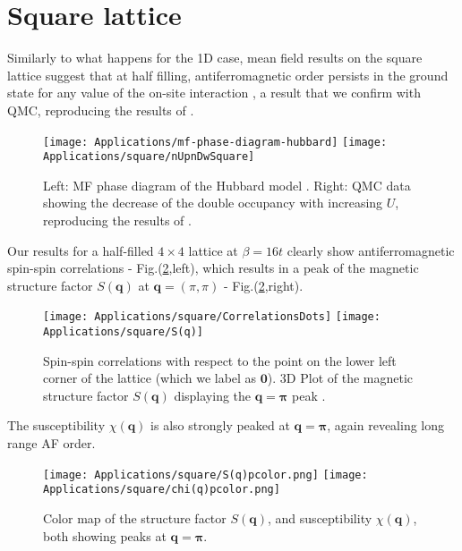 \section{Square lattice}
\label{sec:square}

Similarly to what happens for the \acs{1D} case, mean field results on the square lattice suggest that at half filling, antiferromagnetic order persists in the ground state for any value of the on-site interaction \cite{claveau_mean-field_2014, gouveia_magnetic_2015}, a result that we confirm with \acs{QMC}, reproducing the results of \cite{white_numerical_1989, hirsch_two-dimensional_1985}.

\begin{figure}[H]
\label{fig:mfHubbardPhaseDiagram}
\hspace{-0.18cm}
\texttt{[image: Applications/mf-phase-diagram-hubbard]}
\texttt{[image: Applications/square/nUpnDwSquare]}
\caption[Mean field phase diagram of the Hubbard model. \ac{QMC} data showing the decrease of the double occupancy with increasing $U$.]{Left: MF phase diagram of the Hubbard model \cite{gouveia_magnetic_2015}.
Right: \ac{QMC} data showing the decrease of the double occupancy with increasing $U$, reproducing the results of \cite{white_numerical_1989}.}
\end{figure}
Our results for a half-filled $4 \times 4$ lattice at $\beta = 16 t$ clearly show antiferromagnetic spin-spin correlations - Fig.(\ref{fig:corrSq},left), which results in a peak of the magnetic structure factor $S (\bm q)$ at $\bm q = (\pi, \pi)$ - Fig.(\ref{fig:corrSq},right).
\begin{figure}[H]
\hspace{-0.3cm}
\texttt{[image: Applications/square/CorrelationsDots]}
\hspace{0.4cm}
\texttt{[image: Applications/square/S(q)]}
\caption[Spin-spin correlations on the square lattice.
Magnetic structure factors showing a peak at $\bm q = \bm \pi$.]{Spin-spin correlations with respect to the point on the lower left corner of the lattice (which we label as $\bm 0$).
3D Plot of the magnetic structure factor $S ( \bm q)$ displaying the $\bm q = \bm \pi$ peak \label{fig:corrSq}.}
\end{figure}
The susceptibility $\chi ( \bm q) $ is also strongly peaked at $\bm q = \bm \pi$, again revealing long range \ac{AF} order.
\begin{figure}[H]
\hspace{0.8cm}
\texttt{[image: Applications/square/S(q)pcolor.png]}
\hspace{0.2cm}
\texttt{[image: Applications/square/chi(q)pcolor.png]}
\caption[Color map of the structure factor $S ( \bm q)$, and susceptibility $\chi ( \bm q)$, both showing peaks at $\bm q = \bm\pi$.]{Color map of the structure factor $S ( \bm q)$, and susceptibility $\chi ( \bm q)$, both showing peaks at $\bm q = \bm\pi$.\label{fig:Schi3d}}
\end{figure}
